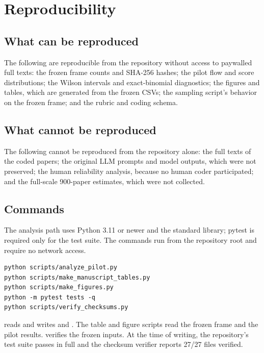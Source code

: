 \documentclass[11pt,a4paper]{article}
\begin{document}
\section{Reproducibility}

\subsection{What can be reproduced}

The following are reproducible from the repository without access to paywalled full texts: the frozen frame counts and SHA-256 hashes; the pilot flow and score distributions; the Wilson intervals and exact-binomial diagnostics; the figures and tables, which are generated from the frozen CSVs; the sampling script's behavior on the frozen frame; and the rubric and coding schema.

\subsection{What cannot be reproduced}

The following cannot be reproduced from the repository alone: the full texts of the coded papers; the original LLM prompts and model outputs, which were not preserved; the human reliability analysis, because no human coder participated; and the full-scale 900-paper estimates, which were not collected.

\subsection{Commands}

The analysis path uses Python 3.11 or newer and the standard library; pytest is required only for the test suite. The commands run from the repository root and require no network access.

\begin{verbatim}
python scripts/analyze_pilot.py
python scripts/make_manuscript_tables.py
python scripts/make_figures.py
python -m pytest tests -q
python scripts/verify_checksums.py
\end{verbatim}

{\raggedright
{} reads  and writes  and . The table and figure scripts read the frozen frame and the pilot results.  verifies the frozen inputs. At the time of writing, the repository's test suite passes in full and the checksum verifier reports 27/27 files verified.\par}
\end{document}
